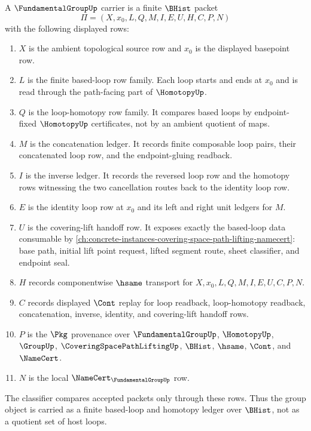 \begin{definition}
\label{def:fundamental-group-carrier}
A $\FundamentalGroupUp$ carrier is a finite $\BHist$ packet
$$
\Pi=(X,x_0,L,Q,M,I,E,U,H,C,P,N)
$$
with the following displayed rows:
\begin{enumerate}
\item $X$ is the ambient topological source row and $x_0$ is the displayed basepoint row.
\item $L$ is the finite based-loop row family. Each loop starts and ends at $x_0$ and is read through the path-facing part of $\HomotopyUp$.
\item $Q$ is the loop-homotopy row family. It compares based loops by endpoint-fixed $\HomotopyUp$ certificates, not by an ambient quotient of maps.
\item $M$ is the concatenation ledger. It records finite composable loop pairs, their concatenated loop row, and the endpoint-gluing readback.
\item $I$ is the inverse ledger. It records the reversed loop row and the homotopy rows witnessing the two cancellation routes back to the identity loop row.
\item $E$ is the identity loop row at $x_0$ and its left and right unit ledgers for $M$.
\item $U$ is the covering-lift handoff row. It exposes exactly the based-loop data consumable by \autoref{ch:concrete-instances-covering-space-path-lifting-namecert}: base path, initial lift point request, lifted segment route, sheet classifier, and endpoint seal.
\item $H$ records componentwise $\hsame$ transport for $X,x_0,L,Q,M,I,E,U,C,P,N$.
\item $C$ records displayed $\Cont$ replay for loop readback, loop-homotopy readback, concatenation, inverse, identity, and covering-lift handoff rows.
\item $P$ is the $\Pkg$ provenance over $\FundamentalGroupUp$, $\HomotopyUp$, $\GroupUp$, $\CoveringSpacePathLiftingUp$, $\BHist$, $\hsame$, $\Cont$, and $\NameCert$.
\item $N$ is the local $\NameCert_{\FundamentalGroupUp}$ row.
\end{enumerate}
The classifier compares accepted packets only through these rows. Thus the group object is carried as a finite based-loop and homotopy ledger over $\BHist$, not as a quotient set of host loops.
\end{definition}

